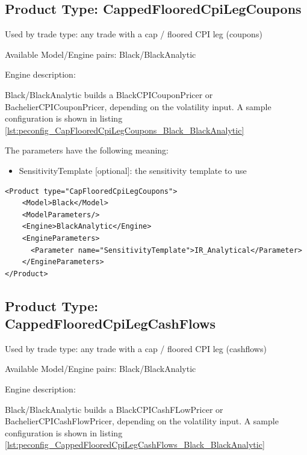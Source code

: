 \subsection{Product Type: CappedFlooredCpiLegCoupons}

Used by trade type: any trade with a cap / floored CPI leg (coupons)

Available Model/Engine pairs: Black/BlackAnalytic

Engine description:

Black/BlackAnalytic builds a BlackCPICouponPricer or BachelierCPICouponPricer, depending on the volatility input. A sample configuration is
shown in listing \ref{lst:peconfig_CapFlooredCpiLegCoupons_Black_BlackAnalytic}

The parameters have the following meaning:

\begin{itemize}
\item SensitivityTemplate [optional]: the sensitivity template to use
\end{itemize}

\begin{longlisting}
\begin{verbatim}
<Product type="CapFlooredCpiLegCoupons">
    <Model>Black</Model>
    <ModelParameters/>
    <Engine>BlackAnalytic</Engine>
    <EngineParameters>
      <Parameter name="SensitivityTemplate">IR_Analytical</Parameter>
    </EngineParameters>
</Product>
\end{verbatim}
\caption{Configuration for Product CapFlooredCpiLegCoupons, Model Black, Engine BlackAnalytic}
\label{lst:peconfig_CapFlooredCpiLegCoupons_Black_BlackAnalytic}
\end{longlisting}

\subsection{Product Type: CappedFlooredCpiLegCashFlows}

Used by trade type: any trade with a cap / floored CPI leg (cashflows)

Available Model/Engine pairs: Black/BlackAnalytic

Engine description:

Black/BlackAnalytic builds a BlackCPICashFLowPricer or BachelierCPICashFlowPricer, depending on the volatility input. A sample configuration is
shown in listing \ref{lst:peconfig_CappedFlooredCpiLegCashFlows_Black_BlackAnalytic}

